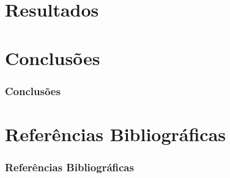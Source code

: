 \documentclass[12pt]{beamer}
\begin{document}
\section{Resultados}

%





\section{Conclusões}

\begin{frame}
\frametitle{Conclusões}

\end{frame}

\section{Referências Bibliográficas}

\begin{frame}
\frametitle{Referências Bibliográficas}







\end{frame}
\end{document}
